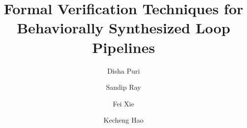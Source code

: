 \documentclass[letterpaper]{llncs}
\begin{document}
\mainmatter  %

\title{Formal Verification Techniques for Behaviorally Synthesized Loop Pipelines}

\author{Disha Puri
\and Sandip Ray 
\and Fei Xie
\and Kecheng Hao} 


\maketitle












\end{document}
